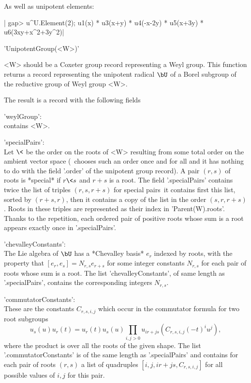 As well as unipotent elements:

|    gap> u^U.Element(2);
    u1(x) * u3(x+y) * u4(-x-2y) * u5(x+3y) * u6(3xy+x^2+3y^2)|


'UnipotentGroup(<W>)'

<W>  should  be  a  Coxeter  group  record  representing a Weyl group. This
function  returns a  record representing  the unipotent  radical $\bU$ of a
Borel subgroup of the reductive group of Weyl group <W>.

The result is a record with the following fields\:

'weylGroup':\\ contains <W>.

'specialPairs':\\  Let $\<$ be the order on  the roots of <W> resulting from
     some total order on the ambient vector space (\CHEVIE\ chooses such an
     order  once  and  for  all  and  it  has  nothing to do with the field
     '.order'  of the unipotent  group record). A  pair $(r,s)$ of roots is
     *special*  if $r\<s$  and $r+s$  is a  root. The field '.specialPairs'
     contains twice the list of triples $(r,s,r+s)$ for special pairs\:\ it
     contains first this list, sorted by $(r+s,r)$, then it contains a copy
     of  the  list  in  the  order  $(s,r,r+s)$. Roots in these triples are
     represented  as  their  index  in  'Parent(W).roots'.  Thanks to the
     repetition,  each ordered pair  of positive roots  whose sum is a root
     appears exactly once in '.specialPairs'.

'chevalleyConstants':\\  The Lie algebra of $\bU$ has a *Chevalley basis*
     $e_r$  indexed  by  roots,  with  the property that $[e_r,e_s]=N_{r,s}
     e_{r+s}$  for some integer constants $N_{r,s}$  for each pair of roots
     whose  sum is a root. The list 'chevalleyConstants', of same length as
     '.specialPairs', contains the corresponding integers $N_{r,s}$.

'commutatorConstants':\\  These are the constants $C_{r,s,i,j}$ which occur
     in the commutator formula for two root subgroups\:
     $$u_s(u)u_r(t)=u_r(t)u_s(u)\prod_{i,j>0}
     u_{ir+js}(C_{r,s,i,j}(-t)^iu^j),$$  where the product  is over all the
     roots  of the given  shape. The list  '.commutatorConstants' is of the
     same  length as  '.specialPairs' and  contains for  each pair of roots
     $(r,s)$   a  list  of  quadruples  $[i,j,ir+js,C_{r,s,i,j}]$  for  all
     possible values of $i,j$ for this pair.

